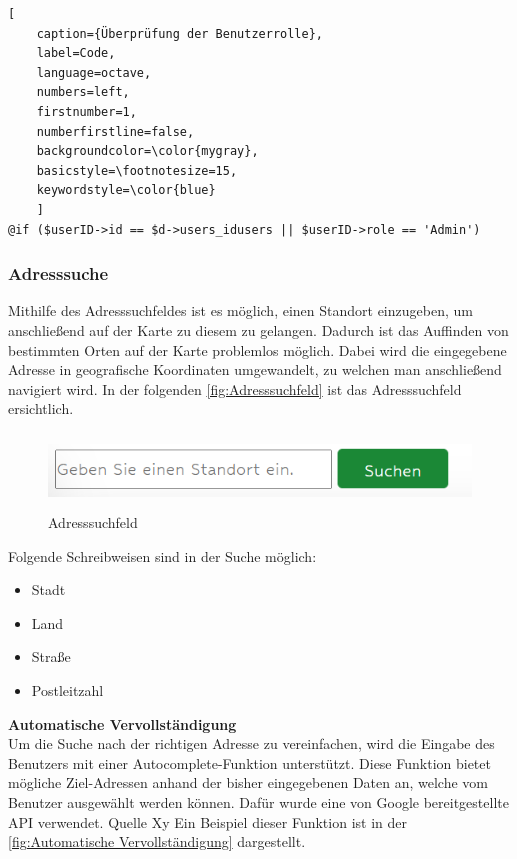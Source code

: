 \begin{lstlisting}[
	caption={Überprüfung der Benutzerrolle},
	label=Code,
	language=octave,
	numbers=left,
	firstnumber=1,
	numberfirstline=false,
	backgroundcolor=\color{mygray},
	basicstyle=\footnotesize=15,
	keywordstyle=\color{blue}
	]
@if ($userID->id == $d->users_idusers || $userID->role == 'Admin')

\end{lstlisting}


\newpage
\subsubsection{Adresssuche}
Mithilfe des Adresssuchfeldes ist es möglich, einen Standort einzugeben, um anschließend auf der Karte zu diesem zu gelangen. Dadurch ist das Auffinden von bestimmten Orten auf der Karte problemlos möglich. Dabei wird die eingegebene Adresse in geografische Koordinaten umgewandelt, zu welchen man anschließend navigiert wird. In der folgenden \autoref{fig:Adresssuchfeld} ist das Adresssuchfeld ersichtlich.
\begin{figure}[h]
	\centering
	\includegraphics[height=2cm,width=15cm]{images/Adresssuchfeld}
	\caption{Adresssuchfeld}
	\label{fig:Adresssuchfeld}
\end{figure}

Folgende Schreibweisen sind in der Suche möglich:
\begin{itemize}
	\item Stadt 
	\item Land
	\item Straße 
	\item Postleitzahl 
\end{itemize}


\textbf{Automatische Vervollständigung} \\
Um die Suche nach der richtigen Adresse zu vereinfachen, wird die Eingabe des Benutzers mit einer Autocomplete-Funktion unterstützt. Diese Funktion bietet mögliche Ziel-Adressen anhand der bisher eingegebenen Daten an, welche vom Benutzer ausgewählt werden können. Dafür wurde eine von Google bereitgestellte API verwendet. 
Quelle Xy 
Ein Beispiel dieser Funktion ist in der \autoref{fig:Automatische Vervollständigung} dargestellt.

